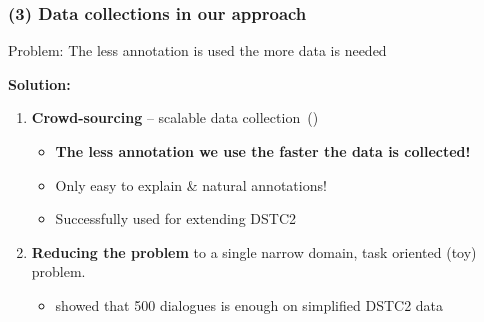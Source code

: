 \documentclass[10pt, compress,british,xcolor={svgnames,dvipsnames,x11names},trans]{beamer}
\begin{document}
\begin{frame}\frametitle{(3) Data collections in our approach}
    {\color{red}Problem: The less annotation is used the more data is needed}
    
    {\bf \color{darkgreen} Solution:}\\
    \begin{enumerate}
        \item {\bf Crowd-sourcing} -- scalable data collection~(\citet{platek2016wochat,wen_networkbased_2016})
            \begin{itemize}
                \item {\bf \color{darkgreen} The less annotation we use the faster the data is collected!}
                \item Only easy to explain \& natural annotations!
                \item Successfully used for extending DSTC2~\cite{wen_networkbased_2016}
            \end{itemize}
        \item {\bf Reducing the problem} to a single narrow domain, task oriented (toy) problem.
            \begin{itemize}
                \item \citet{wen_networkbased_2016} showed that 500 dialogues is enough on simplified DSTC2 data
            \end{itemize}
    \end{enumerate}
\end{frame}
\end{document}
